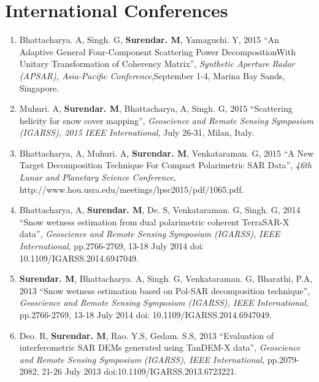 \section*{International Conferences}
  \begin{enumerate}
  \item Bhattacharya. A, Singh. G, \textbf{Surendar. M}, Yamaguchi. Y, 2015 \textquotedblleft An Adaptive General Four-Component Scattering Power DecompositionWith Unitary Transformation of Coherency Matrix\textquotedblright, \textit{Synthetic Aperture Radar (APSAR), Asia-Pacific Conference},September 1-4, Marina Bay Sands, Singapore.
 
 \item Muhuri. A, \textbf{Surendar. M}, Bhattacharya, A, Singh. G, 2015 \textquotedblleft Scattering helicity for snow cover mapping\textquotedblright, \textit{Geoscience and Remote Sensing Symposium (IGARSS), 2015 IEEE International}, July 26-31, Milan, Italy.
  
 \item Bhattacharya, A, Muhuri. A, \textbf{Surendar. M}, Venkataraman. G, 2015 \textquotedblleft A New Target Decomposition Technique For Compact Polarimetric SAR Data\textquotedblright, \textit{46th Lunar and Planetary Science Conference}, http://www.hou.usra.edu/meetings/lpsc2015/pdf/1065.pdf.

\item Bhattacharya, A, \textbf{Surendar. M}, De. S, Venkataraman. G, Singh. G, 2014 \textquotedblleft Snow wetness estimation from dual polarimetric coherent TerraSAR-X data\textquotedblright, \textit{Geoscience and Remote Sensing Symposium (IGARSS), IEEE International}, pp.2766-2769, 13-18 July 2014 doi: 10.1109/IGARSS.2014.6947049.
 
\item \textbf{Surendar. M}, Bhattacharya. A, Singh. G, Venkataraman. G, Bharathi, P.A, 2013 \textquotedblleft Snow wetness estimation based on Pol-SAR decomposition technique\textquotedblright, \textit{Geoscience and Remote Sensing Symposium (IGARSS), IEEE International}, pp.2766-2769, 13-18 July 2014 doi: 10.1109/IGARSS.2014.6947049.

\item Deo. R, \textbf{Surendar. M}, Rao. Y.S, Gedam. S.S, 2013 \textquotedblleft Evaluation of interferometric SAR DEMs generated using TanDEM-X data\textquotedblright, \textit{Geoscience and Remote Sensing Symposium (IGARSS), IEEE International}, pp.2079-2082, 21-26 July 2013 \break doi:10.1109/IGARSS.2013.6723221.


\end{enumerate}
